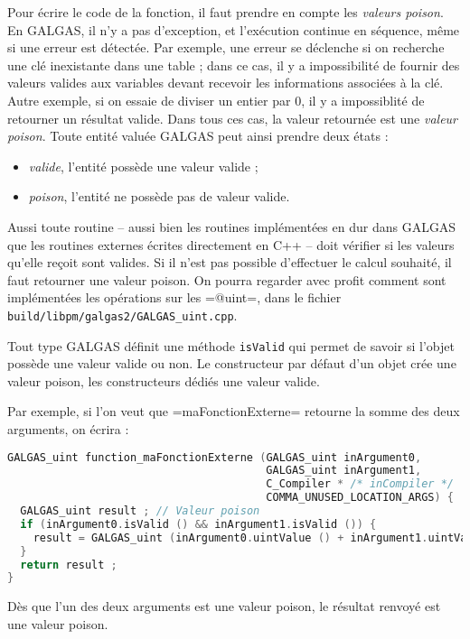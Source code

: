 Pour écrire le code de la fonction, il faut prendre en compte les \emph{valeurs poison}. En GALGAS, il n'y a pas d'exception, et l'exécution continue en séquence, même si une erreur est détectée. Par exemple, une erreur se déclenche si on recherche une clé inexistante dans une table ; dans ce cas, il y a impossibilité de fournir des valeurs valides aux variables devant recevoir les informations associées à la clé. Autre exemple, si on essaie de diviser un entier par $0$, il y a impossiblité de retourner un résultat valide. Dans tous ces cas, la valeur retournée est une \emph{valeur poison}. Toute entité valuée GALGAS peut ainsi prendre deux états :
\begin{itemize}
  \item \emph{valide}, l'entité possède une valeur valide ;
  \item \emph{poison}, l'entité ne possède pas de valeur valide.
\end{itemize}

Aussi toute routine -- aussi bien les routines implémentées en dur dans GALGAS que les routines externes écrites directement en C++ -- doit vérifier si les valeurs qu'elle reçoit sont valides. Si il n'est pas possible d'effectuer le calcul souhaité, il faut retourner une valeur poison. On pourra regarder avec profit comment sont implémentées les opérations sur les \ggs=@uint=, dans le fichier \texttt{build/libpm/galgas2/GALGAS\_uint.cpp}.


Tout type GALGAS définit une méthode \texttt{isValid} qui permet de savoir si l'objet possède une valeur valide ou non. Le constructeur par défaut d'un objet crée une valeur poison, les constructeurs dédiés une valeur valide.

Par exemple, si l'on veut que \ggs=maFonctionExterne= retourne la somme des deux arguments, on écrira :

\begin{lstlisting}[language=C++]
GALGAS_uint function_maFonctionExterne (GALGAS_uint inArgument0,
                                        GALGAS_uint inArgument1,
                                        C_Compiler * /* inCompiler */
                                        COMMA_UNUSED_LOCATION_ARGS) {
  GALGAS_uint result ; // Valeur poison
  if (inArgument0.isValid () && inArgument1.isValid ()) {
    result = GALGAS_uint (inArgument0.uintValue () + inArgument1.uintValue ()) ;
  }
  return result ;
}
\end{lstlisting}

Dès que l'un des deux arguments est une valeur poison, le résultat renvoyé est une valeur poison.


